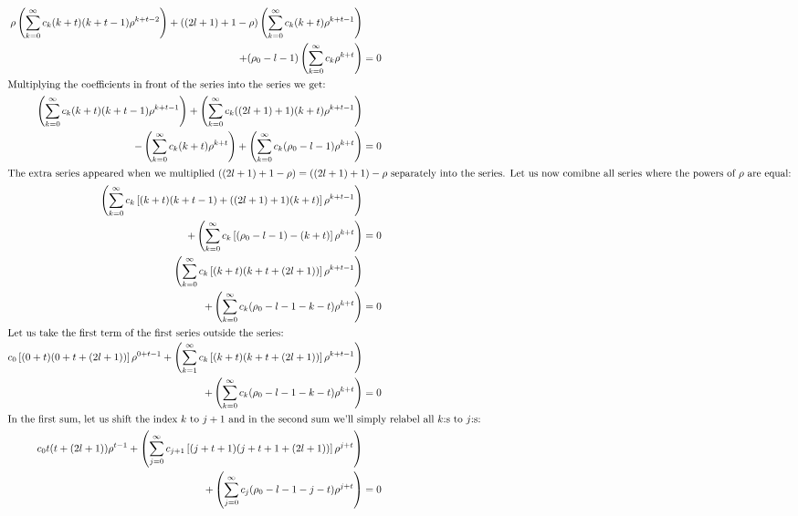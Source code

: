 \documentclass{article}
\begin{document}
    \begin{align}
        \rho\left(\sum_{k = 0}^{\infty}c_k (k + t)(k + t - 1)\rho^{k + t - 2}\right) + ((2l + 1) + 1 - \rho)\left(\sum_{k = 0}^{\infty}c_k (k + t)\rho^{k + t - 1}\right)& \\
        + (\rho_{0} - l - 1)\left(\sum_{k = 0}^{\infty}c_k\rho^{k + t}\right) &= 0 \\
        \intertext{Multiplying the coefficients in front of the series into the series we get:}
        \left(\sum_{k = 0}^{\infty}c_k(k + t)(k + t - 1)\rho^{k + t - 1}\right) + \left(\sum_{k = 0}^{\infty}c_k((2l + 1) + 1)(k + t)\rho^{k + t - 1}\right)& \\
        - \left( \sum_{k=0}^{\infty}c_k(k + t)\rho^{k + t}\right) + \left(\sum_{k = 0}^{\infty}c_k(\rho_{0} - l - 1)\rho^{k + t}\right) &= 0 \\
        \intertext{The extra series appeared when we multiplied $((2l + 1) + 1 - \rho) = ((2l + 1) + 1) - \rho$ separately into the series. Let us now comibne all series where the powers of $\rho$ are equal:}
        \left(\sum_{k = 0}^{\infty}c_k\left[(k + t)(k + t - 1) + ((2l + 1) + 1)(k + t)\right]\rho^{k + t - 1}\right)& \\
        + \left( \sum_{k=0}^{\infty}c_k\left[(\rho_{0} - l - 1) - (k + t)\right]\rho^{k + t}\right) &= 0 \\
        \left(\sum_{k = 0}^{\infty}c_k\left[(k + t)(k + t + (2l + 1))\right]\rho^{k + t - 1}\right)& \\
        + \left( \sum_{k=0}^{\infty}c_k(\rho_{0} - l - 1 - k - t)\rho^{k + t}\right) &= 0 \\
        \intertext{Let us take the first term of the first series outside the series:}
        c_0\left[(0 + t)(0 + t + (2l + 1))\right]\rho^{0 + t - 1} + \left(\sum_{k = 1}^{\infty}c_k\left[(k + t)(k + t + (2l + 1))\right]\rho^{k + t - 1}\right)& \\
        + \left( \sum_{k=0}^{\infty}c_k(\rho_{0} - l - 1 - k - t)\rho^{k + t}\right) &= 0 \\
        \intertext{In the first sum, let us shift the index $k$ to $j + 1$ and in the second sum we'll simply relabel all $k$:s to $j$:s:}
        c_0t(t + (2l + 1))\rho^{t - 1} + \left(\sum_{j = 0}^{\infty}c_{j+1}\left[(j + t + 1)(j + t + 1 + (2l + 1))\right]\rho^{j + t}\right)& \\
        + \left( \sum_{j=0}^{\infty}c_j(\rho_{0} - l - 1 - j - t)\rho^{j + t}\right) &= 0
    \end{align}
\end{document}
